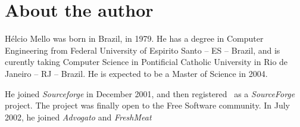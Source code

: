 \chapter*{About the author}
H\'elcio Mello was born in Brazil, in 1979. He has a degree in Computer
Engineering from Federal University of
Espirito Santo -- ES -- Brazil\cite{UFES}, and is curently taking
Computer Science in Pontificial Catholic
University in Rio de Janeiro -- RJ -- Brazil\cite{PUC}. He is expected
to be a Master of Science in 2004.

He joined \emph{Sourceforge}\cite{SF} in December 2001, and then
registered \popasm\ as a \emph{SourceForge}
project. The project was finally open to the Free Software community.
In July 2002, he joined \emph{Advogato}
\cite{ADV,ADVPRSN} and \emph{FreshMeat}\cite{FRESH}
